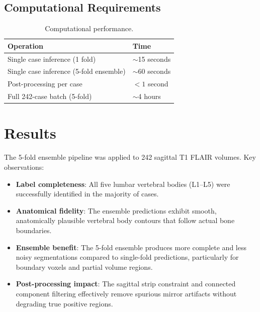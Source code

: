 \documentclass[12pt, a4paper]{article}
\begin{document}
\subsection{Computational Requirements}

\begin{table}[H]
\centering
\caption{Computational performance.}
\begin{tabular}{@{}ll@{}}
\toprule
\textbf{Operation} & \textbf{Time} \\
\midrule
Single case inference (1 fold) & $\sim$15 seconds \\
Single case inference (5-fold ensemble) & $\sim$60 seconds \\
Post-processing per case & $< 1$ second \\
Full 242-case batch (5-fold) & $\sim$4 hours \\
\bottomrule
\end{tabular}
\end{table}

\section{Results}

The 5-fold ensemble pipeline was applied to 242 sagittal T1 FLAIR volumes. Key observations:

\begin{itemize}
    \item \textbf{Label completeness}: All five lumbar vertebral bodies (L1--L5) were successfully identified in the majority of cases.
    \item \textbf{Anatomical fidelity}: The ensemble predictions exhibit smooth, anatomically plausible vertebral body contours that follow actual bone boundaries.
    \item \textbf{Ensemble benefit}: The 5-fold ensemble produces more complete and less noisy segmentations compared to single-fold predictions, particularly for boundary voxels and partial volume regions.
    \item \textbf{Post-processing impact}: The sagittal strip constraint and connected component filtering effectively remove spurious mirror artifacts without degrading true positive regions.
\end{itemize}

\end{document}
